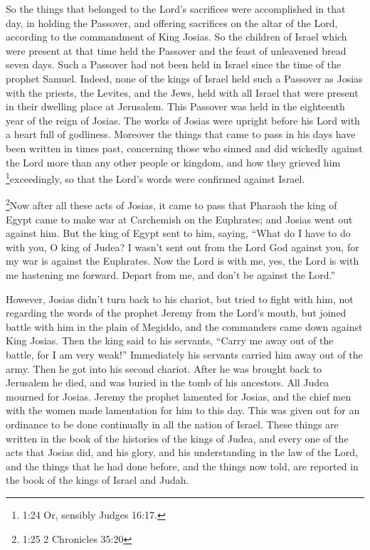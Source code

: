  So the things that belonged to the Lord's sacrifices were
accomplished in that day, in holding the Passover,  and
offering sacrifices on the altar of the Lord, according to the
commandment of King Josias.  So the children of Israel
which were present at that time held the Passover and the feast of
unleavened bread seven days.  Such a Passover had not been
held in Israel since the time of the prophet Samuel. 
Indeed, none of the kings of Israel held such a Passover as Josias with
the priests, the Levites, and the Jews, held with all Israel that were
present in their dwelling place at Jerusalem.  This
Passover was held in the eighteenth year of the reign of Josias.
 The works of Josias were upright before his Lord with a
heart full of godliness.  Moreover the things that came to
pass in his days have been written in times past, concerning those who
sinned and did wickedly against the Lord more than any other people or
kingdom, and how they grieved him \footnote{1:24 Or, sensibly Judges
  16:17.}exceedingly, so that the Lord's words were confirmed against
Israel.

 \footnote{1:25 2 Chronicles 35:20}Now after all these acts
of Josias, it came to pass that Pharaoh the king of Egypt came to make
war at Carchemish on the Euphrates; and Josias went out against him.
 But the king of Egypt sent to him, saying, ``What do I
have to do with you, O king of Judea?  I wasn't sent out
from the Lord God against you, for my war is against the Euphrates. Now
the Lord is with me, yes, the Lord is with me hastening me forward.
Depart from me, and don't be against the Lord.''

 However, Josias didn't turn back to his chariot, but tried
to fight with him, not regarding the words of the prophet Jeremy from
the Lord's mouth,  but joined battle with him in the plain
of Megiddo, and the commanders came down against King Josias.
 Then the king said to his servants, ``Carry me away out of
the battle, for I am very weak!'' Immediately his servants carried him
away out of the army.  Then he got into his second chariot.
After he was brought back to Jerusalem he died, and was buried in the
tomb of his ancestors.  All Judea mourned for Josias.
Jeremy the prophet lamented for Josias, and the chief men with the women
made lamentation for him to this day. This was given out for an
ordinance to be done continually in all the nation of Israel.
 These things are written in the book of the histories of
the kings of Judea, and every one of the acts that Josias did, and his
glory, and his understanding in the law of the Lord, and the things that
he had done before, and the things now told, are reported in the book of
the kings of Israel and Judah.

